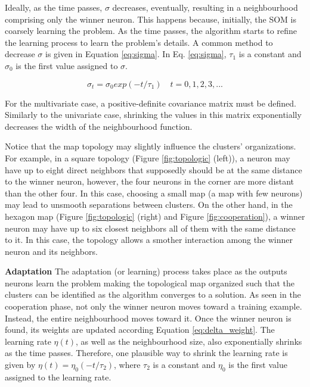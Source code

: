 Ideally, as the time passes, $\sigma$ decreases, eventually, resulting in a neighbourhood comprising only the winner neuron. This happens because, initially, the SOM is coarsely learning the problem. As the time passes, the algorithm starts to refine the learning process to learn the problem's details. A common method to decrease $\sigma$ is given in Equation \ref{eq:sigma}. In Eq. \ref{eq:sigma}, $\tau_{1}$ is a constant and $\sigma_{0}$ is the first value assigned to $\sigma$.

\begin{equation}
    \sigma_{t} = \sigma_{0} exp(-t/\tau_{1}) \quad t = 0, 1, 2, 3,...
    \label{eq:sigma}
\end{equation}

For the multivariate case, a positive-definite covariance matrix must be defined. Similarly to the univariate case, shrinking the values in this matrix exponentially decreases the width of the neighbourhood function.  

Notice that the map topology may slightly influence the clusters' organizations. For example, in a square topology (Figure \ref{fig:topologic} (left)), a neuron may have up to eight direct neighbors that supposedly should be at the same distance to the winner neuron, however, the four neurons in the corner are more distant than the other four. In this case, choosing a small map (a map with few neurons) may lead to unsmooth separations between clusters. On the other hand, in the hexagon map (Figure \ref{fig:topologic} (right) and Figure \ref{fig:cooperation}), a winner neuron may have up to six closest neighbors all of them with the same distance to it. In this case, the topology allows a smother interaction among the winner neuron and its neighbors. 


\vspace{0.2cm}

\noindent\textbf{Adaptation} The adaptation (or learning) process takes place as the outputs neurons learn the problem making the topological map organized such that the clusters can be identified as the algorithm converges to a solution. As seen in the cooperation phase, not only the winner neuron moves toward a training example. Instead, the entire neighbourhood moves toward it. Once the winner neuron is found, its weights are updated according Equation \ref{eq:delta_weight}. The learning rate $\eta(t)$, as well as the neighbourhood size, also exponentially shrinks as the time passes. Therefore, one plausible way to shrink the learning rate is given by $\eta (t) = \eta_{0} (-t/\tau_{2})$, where $\tau_{2}$ is a constant and $\eta_{0}$ is the first value assigned to the learning rate.

